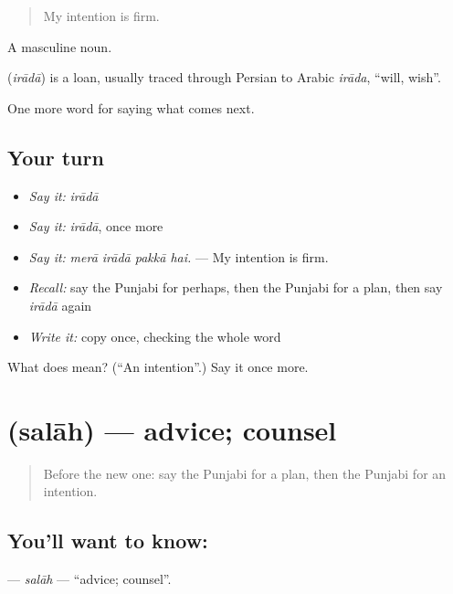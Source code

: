 \begin{quote}
My intention is firm.
\end{quote}

A masculine noun.

\begin{cousinweb}
\textbf{} (\emph{irādā}) is a loan, usually traced through Persian to Arabic \emph{irāda}, \textquotedblleft{}will, wish\textquotedblright{}.
\end{cousinweb}

\begin{grammarlens}[title={What you've built}]
One more word for saying what comes next.
\end{grammarlens}

\subsection*{Your turn}
\begin{itemize}
\raggedright
  \item \emph{Say it:} \emph{irādā}
  \item \emph{Say it:} \emph{irādā}, once more
  \item \emph{Say it:} \emph{merā irādā pakkā hai.} — My intention is firm.
  \item \emph{Recall:} say the Punjabi for perhaps, then the Punjabi for a plan, then say \emph{irādā} again
  \item \emph{Write it:} copy \textbf{} once, checking the whole word
\end{itemize}

\begin{tcolorbox}[breakable,colback=teal!4,colframe=teal!35!black,title={Before you move on}]
What does  mean? (\textquotedblleft{}An intention\textquotedblright{}.) Say it once more.
\end{tcolorbox}
\section[\texorpdfstring{\pa{ਸਲਾਹ} (salāh)}{ਸਲਾਹ (salāh)}]{ (salāh) — advice; counsel}

\label{lesson:PA-C281-salah}



\begin{quote}
Before the new one: say the Punjabi for a plan, then the Punjabi for an intention.
\end{quote}

\subsection*{You'll want to know: }
\textbf{} — \emph{salāh} — \textquotedblleft{}advice; counsel\textquotedblright{}.

